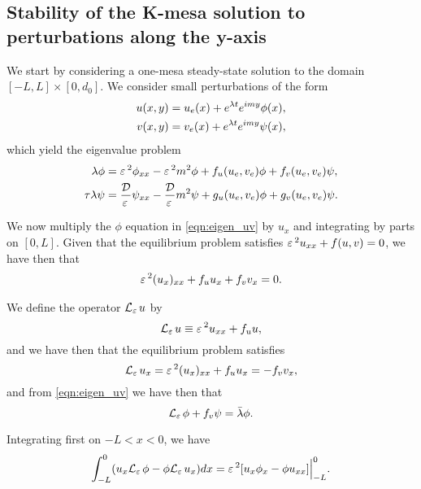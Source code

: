 \subsection{Stability of the K-mesa solution to perturbations along the y-axis}


We start by considering a one-mesa steady-state solution to the domain $[-L,L]\times[0,d_0]$. We consider small perturbations of the form
% 
\begin{equation*}
\begin{split}
\begin{aligned}
  u(x,y) &= u_e(x) + e^{\lambda t}e^{imy}\phi(x),\\
  v(x,y) &= v_e(x) + e^{\lambda t}e^{imy}\psi(x),
\end{aligned}
\end{split}
\end{equation*}
% 
which yield the eigenvalue problem
% 
\begin{equation}
\label{eqn:eigen_uv}
\begin{split}
  \lambda \phi &= \varepsilon\,^2\phi_{xx} - \varepsilon\,^2m^2\phi + f_u(u_e,v_e)\phi + f_v(u_e,v_e)\psi,\\
  \tau\lambda \psi &= \frac{\mathcal{D}}{\varepsilon\,}\psi_{xx} - \frac{\mathcal{D}}{\varepsilon\,}m^2\psi + g_u(u_e,v_e)\phi + g_v(u_e,v_e)\psi.
\end{split}
\end{equation}
% 


We now multiply the $\phi$ equation in \eqref{eqn:eigen_uv} by $u_x$ and integrating by parts on $[0,L]$. Given that the equilibrium problem satisfies $\varepsilon\,^2u_{xx} + f(u,v) = 0$, we have then that
% 
\begin{equation*}
\begin{aligned}
	\varepsilon\,^2(u_x)_{xx} + f_uu_x + f_vv_x = 0.
\end{aligned}
\end{equation*}
% 

We define the operator $\mathcal{L}_{\varepsilon\,}u$ by
% 
\begin{equation*}
   \mathcal{L}_{\varepsilon\,}u\equiv \varepsilon\,^2u_{xx} + f_u u,
\end{equation*}
% 
and we have then that the equilibrium problem satisfies
% 
\[
   \mathcal{L}_{\varepsilon\,}u_x = \varepsilon\,^2(u_x)_{xx} + f_u u_x = -f_v v_x,
\]
% 
and from \eqref{eqn:eigen_uv} we have then that
% 
\[
   \mathcal{L}_{\varepsilon\,}\phi +f_v\psi = \bar{\lambda}\phi.
\]
% 

Integrating first on $-L<x<0$, we have
% 
\[
 \int_{-L}^0(u_x\mathcal{L}_{\varepsilon\,}\phi - \phi\mathcal{L}_{\varepsilon\,}u_x)dx = \Big.\varepsilon\,^2[u_x\phi_x-\phi u_{xx}]\Big|_{-L}^0.
\]
%  

